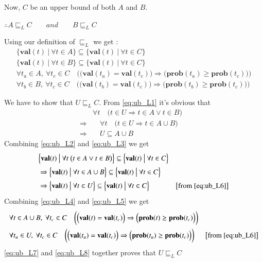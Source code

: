 \documentclass[final,3p, review, times]{util/elsarticle}
\begin{document}
Now, $C$ be an upper bound of both $A$ and $B$.

$\therefore A\sqsubseteq_L C\qquad and\qquad B\sqsubseteq_L C$

Using our definition of $\sqsubseteq_L$ we get :
\begin{align}
&\Big\{\mathbf{val}(t)\ \big|\ \forall t\in A\Big\}\subseteq\Big\{\mathbf{val}(t)\ \big|\ \forall t\in C\Big\}&\label{eq:ub_L2}\\
&\Big\{\mathbf{val}(t)\ \big|\ \forall t\in B\Big\}\subseteq\Big\{\mathbf{val}(t)\ \big|\ \forall t\in C\Big\}&\label{eq:ub_L3}\\
&\forall t_a\in A,\ \forall t_c\in C\quad\bigg(\Big(\mathbf{val}(t_a)=\mathbf{val}(t_c)\Big)\Rightarrow\Big(\mathbf{prob}(t_a)\geq\mathbf{prob}(t_c)\Big)\bigg)&\label{eq:ub_L4}\\
&\forall t_b\in B,\ \forall t_c\in C\quad\bigg(\Big(\mathbf{val}(t_b)=\mathbf{val}(t_c)\Big)\Rightarrow\Big(\mathbf{prob}(t_b)\geq\mathbf{prob}(t_c)\Big)\bigg)&\label{eq:ub_L5}
\end{align}

We have to show that $U\sqsubseteq_L C$. From \ref{eq:ub_L1} it's obvious that
\begin{align}
&\forall t\quad\Big(t\in U\Rightarrow t\in A\lor t\in B\Big)\nonumber\\
\Rightarrow&\quad\forall t\quad\Big(t\in U\Rightarrow t\in A\cup B\Big)&\nonumber\\
\Rightarrow&\quad U\subseteq A\cup B&\label{eq:ub_L6}
\end{align}
Combining \ref{eq:ub_L2} and \ref{eq:ub_L3} we get
\begin{align}
&\Big\{\mathbf{val}(t)\ \big|\ \forall t\ \big(t\in A\lor t\in B\big)\Big\}\subseteq\Big\{\mathbf{val}(t)\ \big|\ \forall t\in C\Big\}&\nonumber\\
&\Rightarrow\Big\{\mathbf{val}(t)\ \big|\ \forall t\in A\cup B\Big\}\subseteq\Big\{\mathbf{val}(t)\ \big|\ \forall t\in C\Big\}&\nonumber\\
&\Rightarrow\Big\{\mathbf{val}(t)\ \big|\ \forall t\in U\Big\}\subseteq\Big\{\mathbf{val}(t)\ \big|\ \forall t\in C\Big\}&\big[\text{from}\ \ref{eq:ub_L6}\big]\label{eq:ub_L7}
\end{align}
Combining \ref{eq:ub_L4} and \ref{eq:ub_L5} we get
\begin{align}
&\forall t\in A\cup B,\ \forall t_c\in C\quad\bigg(\Big(\mathbf{val}(t)=\mathbf{val}(t_c)\Big)\Rightarrow\Big(\mathbf{prob}(t)\geq\mathbf{prob}(t_c)\Big)\bigg)&\nonumber\\
&\forall t_u\in U,\ \forall t_c\in C\quad\bigg(\Big(\mathbf{val}(t_u)=\mathbf{val}(t_c)\Big)\Rightarrow\Big(\mathbf{prob}(t_u)\geq\mathbf{prob}(t_c)\Big)\bigg)&\big[\text{from}\ \ref{eq:ub_L6}\big]\label{eq:ub_L8}
\end{align}
\ref{eq:ub_L7} and \ref{eq:ub_L8} together proves that $U\sqsubseteq_L C$
\end{document}
